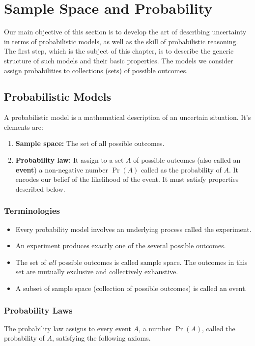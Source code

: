 \chapter{Sample Space and Probability}
Our main objective of this section is to develop the art of describing un­certainty in terms of probabilistic models, as  well as the skill of probabilistic reasoning. The first step, which is the subject of this chapter, is to describe the generic structure of such models and their basic properties. The models we consider assign probabilities to collections (sets) of possible outcomes.

\section{Probabilistic Models}

A probabilistic model is a mathematical description of an uncertain situation. It's elements are:

\begin{enumerate}
    \item \textbf{Sample space:} The set of all possible outcomes.
    \item \textbf{Probability law:} It assign to a set $A$ of possible outcomes (also called an \textbf{event}) a non-negative number $\Pr(A)$ called as the probability of $A$. It encodes our belief of the likelihood of the event. It must satisfy properties described below.
\end{enumerate}

\subsection{Terminologies}

\begin{itemize}
    \item Every probability model involves an underlying process called the experiment.
    \item An experiment produces exactly one of the several possible outcomes.
    \item The set of \textit{all} possible outcomes is called sample space. The outcomes in this set are mutually exclusive and collectively exhaustive.
    \item A subset of sample space (collection of possible outcomes) is called an event.
\end{itemize}

\subsection{Probability Laws}
The probability law assigns to  every event $A$, a number $\Pr(A)$, called the probability of $A$, satisfying the following axioms.

